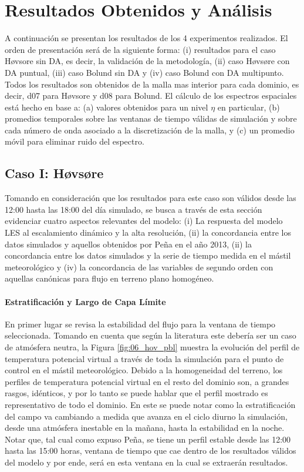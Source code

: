\chapter{Resultados Obtenidos y Análisis}
A continuación se presentan los resultados de los 4 experimentos realizados. El orden de presentación será de la siguiente forma: (i) resultados para el caso Høvsore sin DA, es decir, la validación de la metodología, (ii) caso Høvsøre con DA puntual, (iii) caso Bolund sin DA y (iv) caso Bolund con DA multipunto. Todos los resultados son obtenidos de la malla mas interior para cada dominio, es decir, d07 para Høvsore y d08 para Bolund. El cálculo de los espectros espaciales está hecho en base a: (a) valores obtenidos para un nivel $\eta$ en particular, (b) promedios temporales sobre las ventanas de tiempo válidas de simulación y sobre cada número de onda asociado a la discretización de la malla, y (c) un promedio móvil para eliminar ruido del espectro.
\section{Caso I: Høvsøre}
Tomando en consideración que los resultados para este caso son válidos desde las 12:00 hasta las 18:00 del día simulado, se busca a través de esta sección evidenciar cuatro aspectos relevantes del modelo: (i) La respuesta del modelo LES al escalamiento dinámico y la alta resolución, (ii) la concordancia entre los datos simulados y aquellos obtenidos por Peña en el año 2013, (ii) la concordancia entre los datos simulados y la serie de tiempo medida en el mástil meteorológico y (iv) la concordancia de las variables de segundo orden con aquellas canónicas para flujo en terreno plano homogéneo.

\subsubsection{Estratificación y Largo de Capa Límite}
En primer lugar se revisa la estabilidad del flujo para la ventana de tiempo seleccionada. Tomando en cuenta que según la literatura este debería ser un caso de atmósfera neutra, la Figura \ref{fig:06_hov_pbl} muestra la evolución del perfil de temperatura potencial virtual a través de toda la simulación para el punto de control en el mástil meteorológico. Debido a la homogeneidad del terreno, los perfiles de temperatura potencial virtual en el resto del dominio son, a grandes rasgos, idénticos, y por lo tanto se puede hablar que el perfil mostrado es representativo de todo el dominio. En este se puede notar como la estratificación del campo va cambiando a medida que avanza en el ciclo diurno la simulación, desde una atmósfera inestable en la mañana, hasta la estabilidad en la noche. Notar que, tal cual como expuso Peña, se tiene un perfil estable desde las 12:00 hasta las 15:00 horas, ventana de tiempo que cae dentro de los resultados válidos del modelo y por ende, será en esta ventana en la cual se extraerán resultados.

